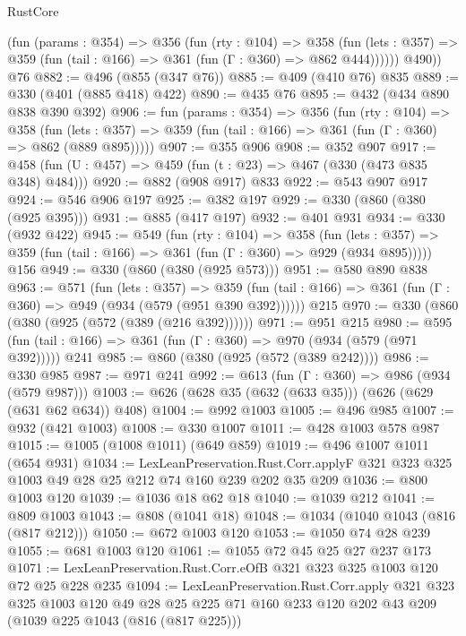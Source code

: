 \begin{lexlean}{RustCore}
\begin{coremodule}
          (fun (params : @354) =>
          @356
            (fun (rty : @104) =>
            @358
              (fun (lets : @357) =>
              @359 (fun (tail : @166) => @361 (fun (Γ : @360) => @862 @444))))))
        @490))
    @76
@882 := @496 (@855 (@347 @76))
@885 := @409 (@410 @76) @835
@889 := @330 (@401 (@885 @418) @422)
@890 := @435 @76
@895 := @432 (@434 @890 @838 @390 @392)
@906 := fun (params : @354) =>
  @356
    (fun (rty : @104) =>
    @358
      (fun (lets : @357) => @359 (fun (tail : @166) => @361 (fun (Γ : @360) => @862 (@889 @895)))))
@907 := @355 @906
@908 := @352 @907
@917 := @458 (fun (U : @457) => @459 (fun (t : @23) => @467 (@330 (@473 @835 @348) @484)))
@920 := @882 (@908 @917) @833
@922 := @543 @907 @917
@924 := @546 @906 @197
@925 := @382 @197
@929 := @330 (@860 (@380 (@925 @395)))
@931 := @885 (@417 @197)
@932 := @401 @931
@934 := @330 (@932 @422)
@945 := @549
    (fun (rty : @104) =>
    @358
      (fun (lets : @357) => @359 (fun (tail : @166) => @361 (fun (Γ : @360) => @929 (@934 @895)))))
    @156
@949 := @330 (@860 (@380 (@925 @573)))
@951 := @580 @890 @838
@963 := @571
    (fun (lets : @357) =>
    @359 (fun (tail : @166) => @361 (fun (Γ : @360) => @949 (@934 (@579 (@951 @390 @392))))))
    @215
@970 := @330 (@860 (@380 (@925 (@572 (@389 (@216 @392))))))
@971 := @951 @215
@980 := @595 (fun (tail : @166) => @361 (fun (Γ : @360) => @970 (@934 (@579 (@971 @392))))) @241
@985 := @860 (@380 (@925 (@572 (@389 @242))))
@986 := @330 @985
@987 := @971 @241
@992 := @613 (fun (Γ : @360) => @986 (@934 (@579 @987)))
@1003 := @626 (@628 @35 (@632 (@633 @35))) (@626 (@629 (@631 @62 @634)) @408)
@1004 := @992 @1003
@1005 := @496 @985
@1007 := @932 (@421 @1003)
@1008 := @330 @1007
@1011 := @428 @1003 @578 @987
@1015 := @1005 (@1008 @1011) (@649 @859)
@1019 := @496 @1007 @1011 (@654 @931)
@1034 := LexLeanPreservation.Rust.Corr.applyF
    @321
    @323
    @325
    @1003
    @49
    @28
    @25
    @212
    @74
    @160
    @239
    @202
    @35
    @209
@1036 := @800 @1003 @120
@1039 := @1036 @18 @62 @18
@1040 := @1039 @212
@1041 := @809 @1003
@1043 := @808 (@1041 @18)
@1048 := @1034 (@1040 @1043 (@816 (@817 @212)))
@1050 := @672 @1003 @120
@1053 := @1050 @74 @28 @239
@1055 := @681 @1003 @120
@1061 := @1055 @72 @45 @25 @27 @237 @173
@1071 := LexLeanPreservation.Rust.Corr.eOfB @321 @323 @325 @1003 @120 @72 @25 @228 @235
@1094 := LexLeanPreservation.Rust.Corr.apply
    @321
    @323
    @325
    @1003
    @120
    @49
    @28
    @25
    @225
    @71
    @160
    @233
    @120
    @202
    @43
    @209
    (@1039 @225 @1043 (@816 (@817 @225)))

\end{coremodule}
\end{lexlean}
